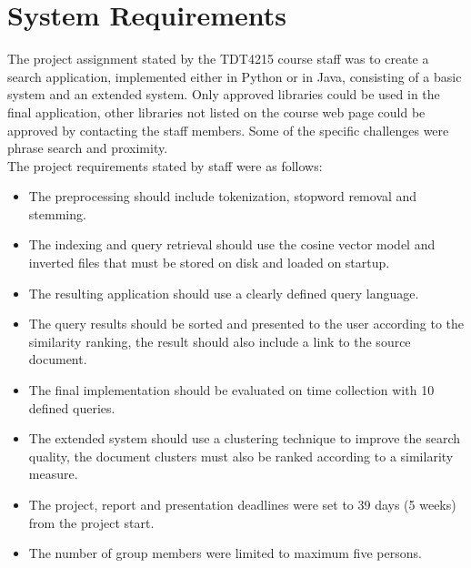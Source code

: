 \chapter{System Requirements}
\label{sec:requirements}
\thispagestyle{fancy}
The project assignment stated by the TDT4215 course staff was to create a search application, implemented either in Python or in Java, consisting of a basic system and an extended system. Only approved libraries could be used in the final application, other libraries not listed on the course web page could be approved by contacting the staff members. Some of the specific challenges were phrase search and proximity.\\

\noindent The project requirements stated by staff were as follows:
\begin{itemize}
	\item The preprocessing should include tokenization, stopword removal and stemming.
	\item The indexing and query retrieval should use the cosine vector model and inverted files that must be stored on disk and loaded on startup.
	\item The resulting application should use a clearly defined query language.
	\item The query results should be sorted and presented to the user according to the similarity ranking, the result should also include a link to the source document.
	\item The final implementation should be evaluated on time collection with 10 defined queries.
	\item The extended system should use a clustering technique to improve the search quality, the document clusters must also be ranked according to a similarity measure.
	\item The project, report and presentation deadlines were set to 39 days (5 weeks) from the project start.
	\item The number of group members were limited to maximum five persons.
\end{itemize}
